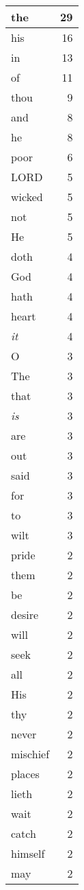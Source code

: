 \begin{center}
\begin{longtable}{l|r}
\hline \hline
\endlastfoot
the & 29 \\ \hline
his & 16 \\ \hline
in & 13 \\ \hline
of & 11 \\ \hline
thou & 9 \\ \hline
and & 8 \\ \hline
he & 8 \\ \hline
poor & 6 \\ \hline
LORD & 5 \\ \hline
wicked & 5 \\ \hline
not & 5 \\ \hline
He & 5 \\ \hline
doth & 4 \\ \hline
God & 4 \\ \hline
hath & 4 \\ \hline
heart & 4 \\ \hline
\emph{it} & 4 \\ \hline
O & 3 \\ \hline
The & 3 \\ \hline
that & 3 \\ \hline
\emph{is} & 3 \\ \hline
are & 3 \\ \hline
out & 3 \\ \hline
said & 3 \\ \hline
for & 3 \\ \hline
to & 3 \\ \hline
wilt & 3 \\ \hline
pride & 2 \\ \hline
them & 2 \\ \hline
be & 2 \\ \hline
desire & 2 \\ \hline
will & 2 \\ \hline
seek & 2 \\ \hline
all & 2 \\ \hline
His & 2 \\ \hline
thy & 2 \\ \hline
never & 2 \\ \hline
mischief & 2 \\ \hline
places & 2 \\ \hline
lieth & 2 \\ \hline
wait & 2 \\ \hline
catch & 2 \\ \hline
himself & 2 \\ \hline
may & 2 \\ \hline

\end{longtable}
\end{center}
